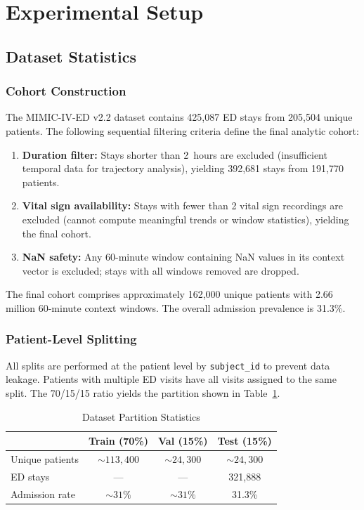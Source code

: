 \documentclass[conference]{IEEEtran}
\begin{document}
\section{Experimental Setup}

\subsection{Dataset Statistics}

\subsubsection{Cohort Construction}
The MIMIC-IV-ED v2.2 dataset contains 425,087 ED stays from 205,504 unique patients. The following sequential filtering criteria define the final analytic cohort:

\begin{enumerate}
    \item \textbf{Duration filter:} Stays shorter than 2~hours are excluded (insufficient temporal data for trajectory analysis), yielding 392,681 stays from 191,770 patients.
    \item \textbf{Vital sign availability:} Stays with fewer than 2 vital sign recordings are excluded (cannot compute meaningful trends or window statistics), yielding the final cohort.
    \item \textbf{NaN safety:} Any 60-minute window containing NaN values in its context vector is excluded; stays with all windows removed are dropped.
\end{enumerate}

The final cohort comprises approximately 162,000 unique patients with 2.66 million 60-minute context windows. The overall admission prevalence is 31.3\%.

\subsubsection{Patient-Level Splitting}
All splits are performed at the patient level by \texttt{subject\_id} to prevent data leakage. Patients with multiple ED visits have all visits assigned to the same split. The 70/15/15 ratio yields the partition shown in Table~\ref{tab:dataset_stats}.

\begin{table}[h]
\caption{Dataset Partition Statistics}
\label{tab:dataset_stats}
\centering
\begin{tabular}{lccc}
\toprule
 & \textbf{Train (70\%)} & \textbf{Val (15\%)} & \textbf{Test (15\%)} \\
\midrule
Unique patients & ${\sim}113{,}400$ & ${\sim}24{,}300$ & ${\sim}24{,}300$ \\
ED stays & --- & --- & 321,888 \\
Admission rate & ${\sim}31\%$ & ${\sim}31\%$ & 31.3\% \\
\bottomrule
\end{tabular}
\end{table}
\end{document}
